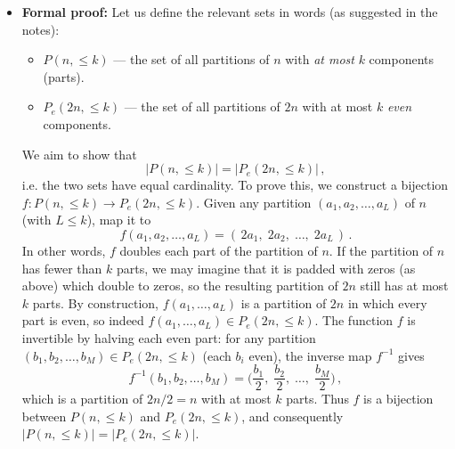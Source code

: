 \documentclass[docmute]{article}
\begin{document}
\begin{itemize}
  \item \textbf{Formal proof:} Let us define the relevant sets in words (as suggested in the notes): 
  \begin{itemize}
    \item $P(n,\le k)$ — the set of all partitions of $n$ with \emph{at most} $k$ components (parts).
    \item $P_e(2n,\le k)$ — the set of all partitions of $2n$ with at most $k$ \emph{even} components.
  \end{itemize}
  We aim to show that 
  \[
    |P(n,\le k)| = |P_e(2n,\le k)|\,,
  \] 
  i.e. the two sets have equal cardinality. To prove this, we construct a bijection $f: P(n,\le k) \to P_e(2n,\le k)$. Given any partition $(a_1,a_2,\dots,a_L)$ of $n$ (with $L \le k$), map it to 
  \[
    f(a_1,a_2,\ldots,a_L) = (\,2a_1,\; 2a_2,\; \ldots,\; 2a_L\,)\,. 
  \] 
  In other words, $f$ doubles each part of the partition of $n$. If the partition of $n$ has fewer than $k$ parts, we may imagine that it is padded with zeros (as above) which double to zeros, so the resulting partition of $2n$ still has at most $k$ parts. By construction, $f(a_1,\ldots,a_L)$ is a partition of $2n$ in which every part is even, so indeed $f(a_1,\ldots,a_L) \in P_e(2n,\le k)$. The function $f$ is invertible by halving each even part: for any partition $(b_1,b_2,\ldots,b_M) \in P_e(2n,\le k)$ (each $b_i$ even), the inverse map $f^{-1}$ gives 
  \[
    f^{-1}(b_1,b_2,\ldots,b_M) = \Big(\frac{b_1}{2},\; \frac{b_2}{2},\; \ldots,\; \frac{b_M}{2}\Big)\,,
  \] 
  which is a partition of $2n/2 = n$ with at most $k$ parts. Thus $f$ is a bijection between $P(n,\le k)$ and $P_e(2n,\le k)$, and consequently $|P(n,\le k)| = |P_e(2n,\le k)|$.
\end{itemize}
\end{document}
